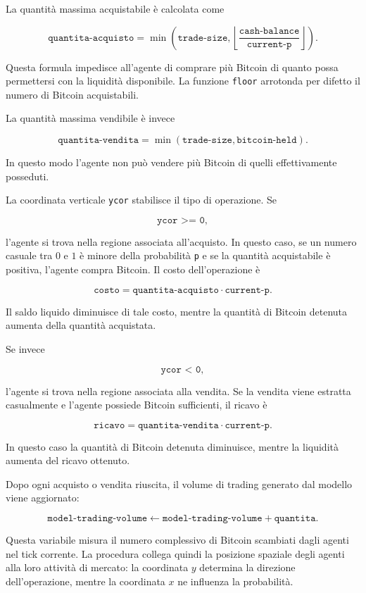 La quantità massima acquistabile è calcolata come

\[
\texttt{quantita-acquisto}
=
\min
\left(
\texttt{trade-size},
\left\lfloor
\frac{\texttt{cash-balance}}{\texttt{current-p}}
\right\rfloor
\right).
\]

Questa formula impedisce all'agente di comprare più Bitcoin di quanto possa
permettersi con la liquidità disponibile. La funzione \texttt{floor} arrotonda
per difetto il numero di Bitcoin acquistabili.

La quantità massima vendibile è invece

\[
\texttt{quantita-vendita}
=
\min
(
\texttt{trade-size},
\texttt{bitcoin-held}
).
\]

In questo modo l'agente non può vendere più Bitcoin di quelli effettivamente
posseduti.

La coordinata verticale \texttt{ycor} stabilisce il tipo di operazione. Se

\[
\texttt{ycor >= 0},
\]

l'agente si trova nella regione associata all'acquisto. In questo caso, se un
numero casuale tra \(0\) e \(1\) è minore della probabilità \texttt{p} e se la
quantità acquistabile è positiva, l'agente compra Bitcoin. Il costo
dell'operazione è

\[
\texttt{costo}
=
\texttt{quantita-acquisto}
\cdot
\texttt{current-p}.
\]

Il saldo liquido diminuisce di tale costo, mentre la quantità di Bitcoin detenuta
aumenta della quantità acquistata.

Se invece

\[
\texttt{ycor < 0},
\]

l'agente si trova nella regione associata alla vendita. Se la vendita viene
estratta casualmente e l'agente possiede Bitcoin sufficienti, il ricavo è

\[
\texttt{ricavo}
=
\texttt{quantita-vendita}
\cdot
\texttt{current-p}.
\]

In questo caso la quantità di Bitcoin detenuta diminuisce, mentre la liquidità
aumenta del ricavo ottenuto.

Dopo ogni acquisto o vendita riuscita, il volume di trading generato dal modello
viene aggiornato:

\[
\texttt{model-trading-volume}
\leftarrow
\texttt{model-trading-volume}
+
\texttt{quantita}.
\]

Questa variabile misura il numero complessivo di Bitcoin scambiati dagli agenti
nel tick corrente. La procedura collega quindi la posizione spaziale degli agenti
alla loro attività di mercato: la coordinata \(y\) determina la direzione
dell'operazione, mentre la coordinata \(x\) ne influenza la probabilità.

